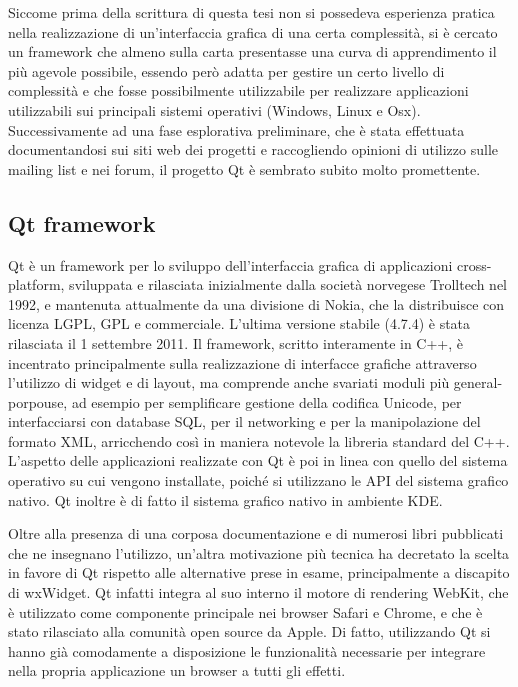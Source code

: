 \documentclass[12pt]{toptesi}
\begin{document}
Siccome prima della scrittura di questa tesi non si possedeva esperienza pratica nella realizzazione di un'interfaccia grafica di una certa complessità, si è cercato un framework che almeno sulla carta presentasse una curva di apprendimento il più agevole possibile, essendo però adatta per gestire un certo livello di complessità e che fosse possibilmente utilizzabile per realizzare applicazioni utilizzabili sui principali sistemi operativi (Windows, Linux e Osx). 
Successivamente ad una fase esplorativa preliminare, che è stata effettuata documentandosi sui siti web dei progetti e raccogliendo opinioni di utilizzo sulle mailing list e nei forum, il progetto Qt è sembrato subito molto promettente. 

\subsection{Qt framework}

Qt è un framework per lo sviluppo dell'interfaccia grafica di applicazioni cross-platform, sviluppata e rilasciata inizialmente dalla società norvegese Trolltech nel 1992, e mantenuta attualmente da una divisione di Nokia, che la distribuisce con licenza LGPL, GPL e commerciale. L'ultima versione stabile (4.7.4) è stata rilasciata il 1 settembre 2011. Il framework, scritto interamente in C++, è incentrato principalmente sulla realizzazione di interfacce grafiche attraverso l'utilizzo di widget e di layout, ma comprende anche svariati moduli più general-porpouse, ad esempio per semplificare gestione della codifica Unicode, per interfacciarsi con database SQL, per il networking e per la manipolazione del formato XML, arricchendo così in maniera notevole la libreria standard del C++. L'aspetto delle applicazioni realizzate con Qt è poi in linea con quello del sistema operativo su cui vengono installate, poiché si utilizzano le API del sistema grafico nativo. Qt inoltre è di fatto il sistema grafico nativo in ambiente KDE. 

Oltre alla presenza di una corposa documentazione e di numerosi libri pubblicati che ne insegnano l'utilizzo, un'altra motivazione più tecnica ha decretato la scelta in favore di Qt rispetto alle alternative prese in esame, principalmente a discapito di wxWidget. Qt infatti integra al suo interno il motore di rendering WebKit, che è utilizzato come componente principale nei browser Safari e Chrome, e che è stato rilasciato alla comunità open source da Apple. Di fatto, utilizzando Qt si hanno già comodamente a disposizione le funzionalità necessarie per integrare nella propria applicazione un browser a tutti gli effetti. 
\end{document}
